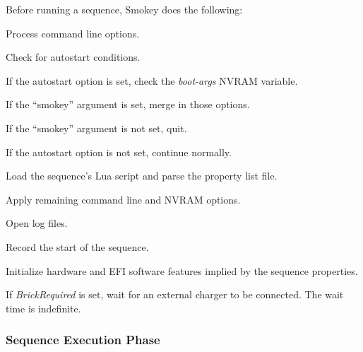 \documentclass[11pt]{article}
\newcommand{\prop}[1]{{\itshape#1}}
\newcommand{\nvram}[1]{\mbox{\itshape#1}}
\newcommand{\nvarg}[1]{\mbox{``#1''}}
\begin{document}
Before running a sequence, Smokey does the following:

\begin{Process}

\item Process command line options.

\item Check for autostart conditions.

	\begin{Process}

	\item If the autostart option is set, check the \nvram{boot-args} NVRAM variable.

		\begin{Process}

		\item If the \nvarg{smokey} argument is set, merge in those options.

		\item If the \nvarg{smokey} argument is not set, quit.

		\end{Process}

	\item If the autostart option is not set, continue normally.

	\end{Process}

\item Load the sequence's Lua script and parse the property list file.

\item Apply remaining command line and NVRAM options.

\item Open log files.

\item Record the start of the sequence.

\item Initialize hardware and EFI software features implied by the sequence
	properties.

\item If \prop{BrickRequired} is set, wait for an external charger to be connected.
	The wait time is indefinite.

\end{Process}

\subsubsection{Sequence Execution Phase}
\end{document}
